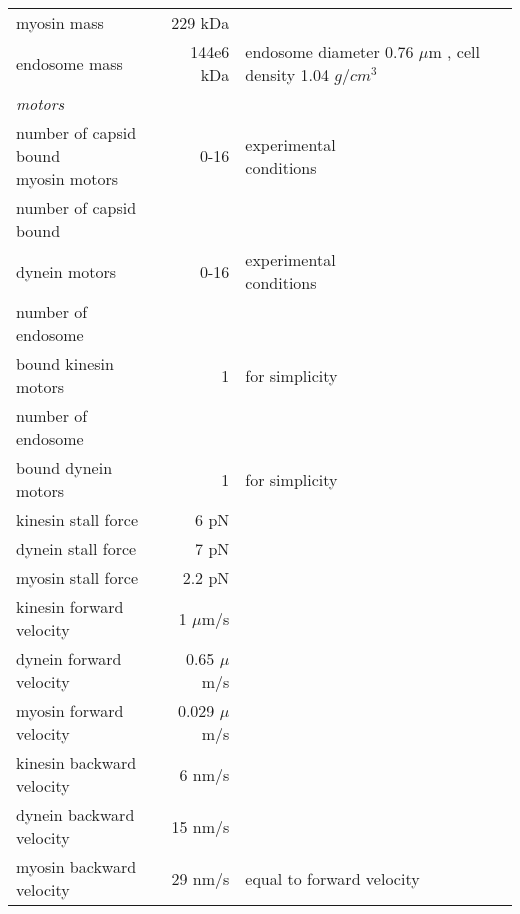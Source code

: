 \begin{longtable}{lrl}
myosin mass &229 kDa & \cite{myosin_mass}\\
endosome mass & 144e6 kDa&\makecell[l]{endosome diameter\\0.76 $\mu$m \cite{ganley2004rab9},\\cell density\\1.04 $g/cm^3$ \cite{ooya1992gravity}}\\
\midrule
\multicolumn{3}{l}{\textit{motors}}\\
\makecell[l]{number of capsid bound\\myosin motors} &0-16 & \makecell[l]{experimental\\conditions}\\
\textbf{}number of capsid bound\\dynein motors} &0-16 & \makecell[l]{experimental\\conditions}\\
\textbf{}number of endosome\\bound kinesin motors} &1 & for simplicity\\
\textbf{}number of endosome\\bound dynein motors} &1 & for simplicity\\
kinesin stall force &6 pN & \cite{muller2008tug}\\
dynein stall force &7 pN & \cite{muller2008tug}\\
myosin stall force &2.2 pN & \cite{norstrom2010unconventional}\\
kinesin forward velocity &1 $\mu$m/s & \cite{muller2008tug}\\
dynein forward velocity &0.65 $\mu$m/s & \cite{muller2008tug}\\
myosin forward velocity &0.029 $\mu$m/s & \cite{norstrom2010unconventional}\\
kinesin backward velocity &6 nm/s & \cite{muller2008tug}\\
dynein backward velocity &15 nm/s & \cite{gennerich2007force}\\
myosin backward velocity &29 nm/s & equal to forward velocity\\
\bottomrule
\end{longtable}